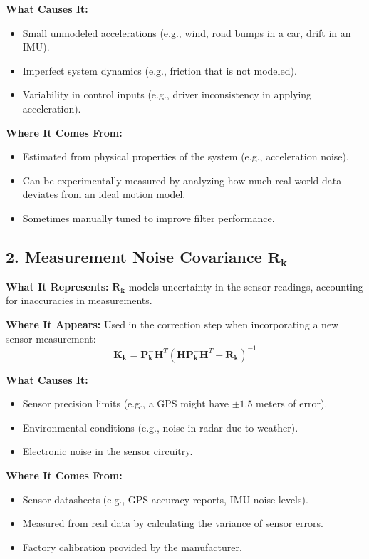 \documentclass{article}
\begin{document}
\textbf{What Causes It:}
\begin{itemize}
    \item Small unmodeled accelerations (e.g., wind, road bumps in a car, drift in an IMU).
    \item Imperfect system dynamics (e.g., friction that is not modeled).
    \item Variability in control inputs (e.g., driver inconsistency in applying acceleration).
\end{itemize}

\textbf{Where It Comes From:}
\begin{itemize}
    \item Estimated from physical properties of the system (e.g., acceleration noise).
    \item Can be experimentally measured by analyzing how much real-world data deviates from an ideal motion model.
    \item Sometimes manually tuned to improve filter performance.
\end{itemize}

\subsection*{2. Measurement Noise Covariance \(\mathbf{R_k}\)}

\textbf{What It Represents:}  
\(\mathbf{R_k}\) models uncertainty in the sensor readings, accounting for inaccuracies in measurements.

\textbf{Where It Appears:}  
Used in the correction step when incorporating a new sensor measurement:
\[
\mathbf{K_k} = \mathbf{P_k^-} \mathbf{H}^T (\mathbf{H} \mathbf{P_k^-} \mathbf{H}^T + \mathbf{R_k})^{-1}
\]

\textbf{What Causes It:}
\begin{itemize}
    \item Sensor precision limits (e.g., a GPS might have \(\pm1.5\) meters of error).
    \item Environmental conditions (e.g., noise in radar due to weather).
    \item Electronic noise in the sensor circuitry.
\end{itemize}

\textbf{Where It Comes From:}
\begin{itemize}
    \item Sensor datasheets (e.g., GPS accuracy reports, IMU noise levels).
    \item Measured from real data by calculating the variance of sensor errors.
    \item Factory calibration provided by the manufacturer.
\end{itemize}
\end{document}
